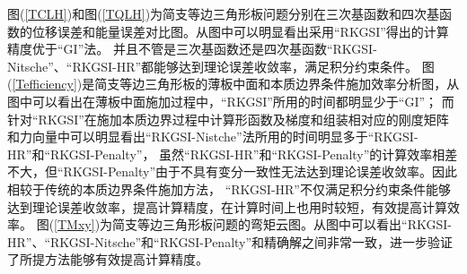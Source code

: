 图(\ref{TCLH})和图(\ref{TQLH})为简支等边三角形板问题分别在三次基函数和四次基函数的位移误差和能量误差对比图。从图中可以明显看出采用“RKGSI”得出的计算精度优于“GI”法。
并且不管是三次基函数还是四次基函数“RKGSI-Nitsche”、“RKGSI-HR”都能够达到理论误差收敛率，满足积分约束条件。
图(\ref{Tefficiency})是简支等边三角形板的薄板中面和本质边界条件施加效率分析图，从图中可以看出在薄板中面施加过程中，“RKGSI”所用的时间都明显少于“GI”；
而针对“RKGSI”在施加本质边界过程中计算形函数及梯度和组装相对应的刚度矩阵和力向量中可以明显看出“RKGSI-Nistche”法所用的时间明显多于“RKGSI-HR”和“RKGSI-Penalty”，
虽然“RKGSI-HR”和“RKGSI-Penalty”的计算效率相差不大，但“RKGSI-Penalty”由于不具有变分一致性无法达到理论误差收敛率。因此相较于传统的本质边界条件施加方法，
“RKGSI-HR”不仅满足积分约束条件能够达到理论误差收敛率，提高计算精度，在计算时间上也用时较短，有效提高计算效率。
图(\ref{TMxy})为简支等边三角形板问题的弯矩云图。从图中可以看出“RKGSI-HR”、“RKGSI-Nitsche”和“RKGSI-Penalty”和精确解之间非常一致，进一步验证了所提方法能够有效提高计算精度。
